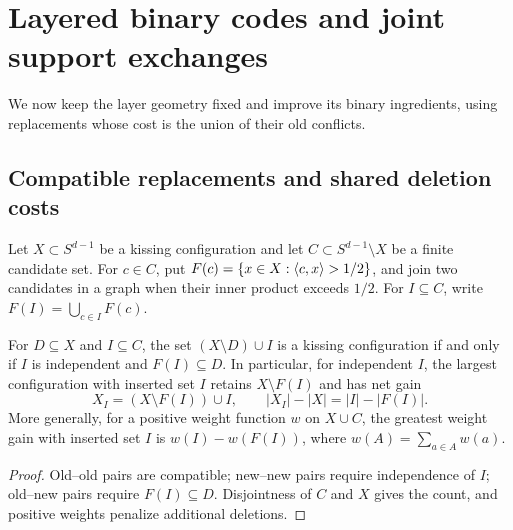 \section{Layered binary codes and joint support exchanges}\label{sec:codes}

We now keep the layer geometry fixed and improve its binary ingredients,
using replacements whose cost is the union of their old conflicts.

\subsection{Compatible replacements and shared deletion costs}
Let $X\subset S^{d-1}$ be a kissing configuration and let
$C\subset S^{d-1}\setminus X$ be a finite candidate set. For $c\in C$,
put $F(c)=\{x\in X:\langle c,x\rangle>1/2\}$, and join two candidates in a
graph when their inner product exceeds $1/2$. For $I\subseteq C$,
write $F(I)=\bigcup_{c\in I}F(c)$.

\begin{proposition}\label{prop:exchange}
For $D\subseteq X$ and $I\subseteq C$, the set $(X\setminus D)\cup I$
is a kissing configuration if and only if $I$ is independent and
$F(I)\subseteq D$. In particular, for independent $I$, the largest
configuration with inserted set $I$ retains $X\setminus F(I)$ and
has net gain
\begin{equation}\label{eq:general-exchange}
 X_I=(X\setminus F(I))\cup I,\qquad
 |X_I|-|X|=|I|-|F(I)|.
\end{equation}
More generally, for a positive weight function $w$ on $X\cup C$,
the greatest weight gain with inserted set $I$ is
$w(I)-w(F(I))$, where $w(A)=\sum_{a\in A}w(a)$.
\end{proposition}
\begin{proof}
Old--old pairs are compatible; new--new pairs require independence of
$I$; old--new pairs require $F(I)\subseteq D$. Disjointness of $C$ and
$X$ gives the count, and positive weights penalize additional deletions.
\end{proof}

